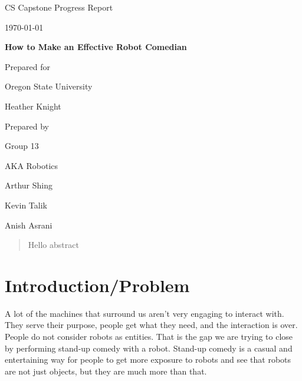 \documentclass[onecolumn, draftclsnofoot,10pt, compsoc]{IEEEtran}
\def \CapstoneTeamName{		AKA Robotics}
\def \CapstoneTeamNumber{		13}
\def \GroupMemberOne{     Arthur Shing}
\def \GroupMemberTwo{			Kevin Talik}
\def \GroupMemberThree{   Anish Asrani}
\def \CapstoneProjectName{		How to Make an Effective Robot Comedian}
\def \CapstoneSponsorCompany{	Oregon State University}
\def \CapstoneSponsorPerson{		Heather Knight}
\def \DocType{		%
				Progress Report
				}
\newcommand{\NameSigPair}[1]{\par
\makebox[2.75in][r]{#1} \hfil 	\makebox[3.25in]{\makebox[2.25in]{\hrulefill} \hfill		\makebox[.75in]{\hrulefill}}
\par\vspace{-12pt} \textit{\tiny\noindent
\makebox[2.75in]{} \hfil		\makebox[3.25in]{\makebox[2.25in][r]{Signature} \hfill	\makebox[.75in][r]{Date}}}}
\renewcommand{\NameSigPair}[1]{#1}
\begin{document}
\begin{titlepage}
    \begin{singlespace}
        \hfill
        \par\vspace{.2in}
        \centering
        \scshape{
            \huge CS Capstone \DocType \par
            {\large\today}\par
            \vspace{.5in}
            \textbf{\Huge\CapstoneProjectName}\par
            \vfill
            {\large Prepared for}\par
            \Huge \CapstoneSponsorCompany\par
            \vspace{5pt}
            {\Large\NameSigPair{\CapstoneSponsorPerson}\par}
            {\large Prepared by }\par
            Group\CapstoneTeamNumber\par
            \CapstoneTeamName\par
            \vspace{5pt}
            {\Large
                \NameSigPair{\GroupMemberOne}\par
                \NameSigPair{\GroupMemberTwo}\par
                \NameSigPair{\GroupMemberThree}\par
            }
            \vspace{20pt}
        }
        \begin{abstract}
       	Hello abstract
        \end{abstract}
    \end{singlespace}
\end{titlepage}
\newpage
{}
\tableofcontents
\clearpage

\section{Introduction/Problem}
A lot of the machines that surround us aren't very engaging to interact with. They serve their purpose, people get what they need, and the interaction is over. People do not consider robots as entities. That is the gap we are trying to close by performing stand-up comedy with a robot. Stand-up comedy is a casual and entertaining way for people to get more exposure to robots and see that robots are not just objects, but they are much more than that.
\end{document}
